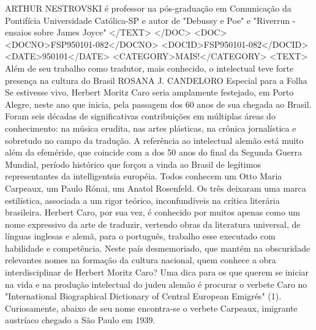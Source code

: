 ARTHUR NESTROVSKI é professor na pós-graduação em Comunicação da Pontifícia Universidade Católica-SP e autor de "Debussy e Poe" e "Riverrun - ensaios sobre James Joyce"
</TEXT>
</DOC>
<DOC>
<DOCNO>FSP950101-082</DOCNO>
<DOCID>FSP950101-082</DOCID>
<DATE>950101</DATE>
<CATEGORY>MAIS!</CATEGORY>
<TEXT>
Além de seu trabalho como tradutor, mais conhecido, o intelectual teve forte presença na cultura do Brasil 
ROSANA J. CANDELORO 
Especial para a Folha 
Se estivesse vivo, Herbert Moritz Caro seria amplamente festejado, em Porto Alegre, neste ano que inicia, pela passagem dos 60 anos de sua chegada ao Brasil. Foram seis décadas de significativas contribuições em múltiplas áreas do conhecimento: na música erudita, nas artes plásticas, na crônica jornalística e sobretudo no campo da tradução.
A referência ao intelectual alemão está muito além da efeméride, que coincide com a dos 50 anos do final da Segunda Guerra Mundial, período histórico que forçou a vinda ao Brasil de legítimos representantes da intelligentsia européia.
Todos conhecem um Otto Maria Carpeaux, um Paulo Rónai, um Anatol Rosenfeld. Os três deixaram uma marca estilística, associada a um rigor teórico, inconfundíveis na crítica literária brasileira.
Herbert Caro, por sua vez, é conhecido por muitos apenas como um nome expressivo da arte de traduzir, vertendo obras da literatura universal, de línguas inglesas e alemã, para o português, trabalho esse executado com habilidade e competência.
Neste país desmemoriado, que mantém na obscuridade relevantes nomes na formação da cultura nacional, quem conhece a obra interdisciplinar de Herbert Moritz Caro? Uma dica para os que querem se iniciar na vida e na produção intelectual do judeu alemão é procurar o verbete Caro no "International Biographical Dictionary of Central European Emigrés" (1). Curiosamente, abaixo de seu nome encontra-se o verbete Carpeaux, imigrante austríaco chegado a São Paulo em 1939.

